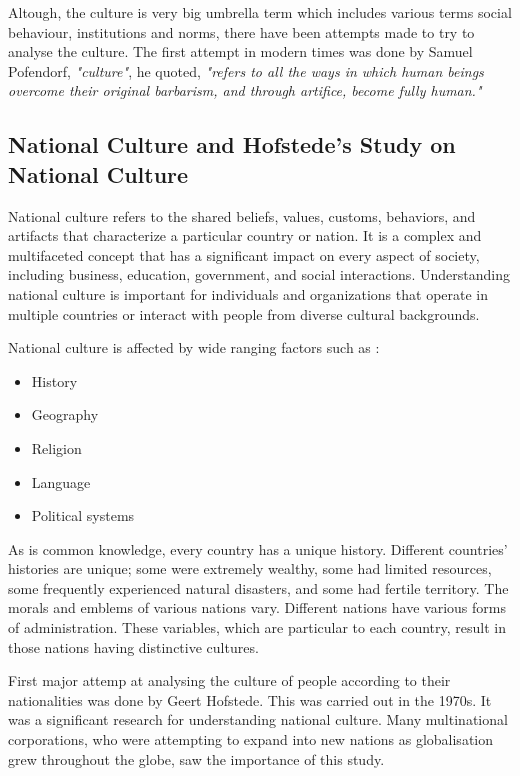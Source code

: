 \documentclass{article}
\begin{document}
Altough, the culture is very big umbrella term which includes various terms social behaviour, institutions and norms, there have been attempts made to try to analyse the culture. The first attempt in modern times was done by Samuel Pofendorf, \textit{"culture"}, he quoted, \textit{"refers to all the ways in which human beings overcome their original barbarism, and through artifice, become fully human."}

\subsection{National Culture and Hofstede's Study on National Culture}

National culture refers to the shared beliefs, values, customs, behaviors, and artifacts that characterize a particular country or nation. It is a complex and multifaceted concept that has a significant impact on every aspect of society, including business, education, government, and social interactions. Understanding national culture is important for individuals and organizations that operate in multiple countries or interact with people from diverse cultural backgrounds.

National culture is affected by wide ranging factors such as :
\begin{itemize}
    \item History
    \item Geography
    \item Religion
    \item Language
    \item Political systems
\end{itemize}

As is common knowledge, every country has a unique history. Different countries' histories are unique; some were extremely wealthy, some had limited resources, some frequently experienced natural disasters, and some had fertile territory. The morals and emblems of various nations vary. Different nations have various forms of administration. These variables, which are particular to each country, result in those nations having distinctive cultures.

First major attemp at analysing the culture of people according to their nationalities was done by Geert Hofstede. This was carried out in the 1970s. It was a significant research for understanding national culture. Many multinational corporations, who were attempting to expand into new nations as globalisation grew throughout the globe, saw the importance of this study.
\end{document}
